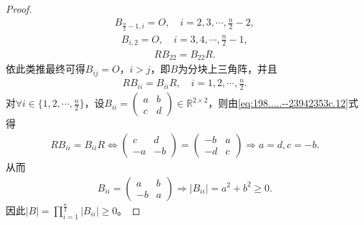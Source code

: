 \documentclass[../../main.tex]{subfiles}%
\begin{document}
\begin{proof}
\begin{align*}
B_{\frac{n}{2}-1,i} = O, \quad i = 2,3,\cdots,\frac{n}{2}-2,
\end{align*}
\begin{align*}
B_{i,2} = O, \quad i = 3,4,\cdots,\frac{n}{2}-1,
\end{align*}
\begin{align*}
RB_{22} = B_{22}R.
\end{align*}
依此类推最终可得\(B_{ij} = O\)，\(i > j\)，即\(B\)为分块上三角阵，并且
\begin{align}
RB_{ii} = B_{ii}R, \quad i = 1,2,\cdots,\frac{n}{2}. \label{eq:198.....--23942353c.12}
\end{align}
对\(\forall i \in \{1,2,\cdots,\frac{n}{2}\}\)，设\(B_{ii} = \begin{pmatrix} a & b \\ c & d \end{pmatrix} \in \mathbb{R}^{2 \times 2}\)，则由\eqref{eq:198.....--23942353c.12}式得
\begin{align*}
RB_{ii} = B_{ii}R \Longleftrightarrow \begin{pmatrix} c & d \\ -a & -b \end{pmatrix} = \begin{pmatrix} -b & a \\ -d & c \end{pmatrix} \Longrightarrow a = d, c = -b.
\end{align*}
从而
\begin{align*}
B_{ii} = \begin{pmatrix} a & b \\ -b & a \end{pmatrix} \Longrightarrow |B_{ii}| = a^2 + b^2 \geqslant 0.
\end{align*}
因此\(|B| = \prod_{i=1}^{\frac{n}{2}} |B_{ii}| \geqslant 0\)。


\end{proof}
\end{document}
